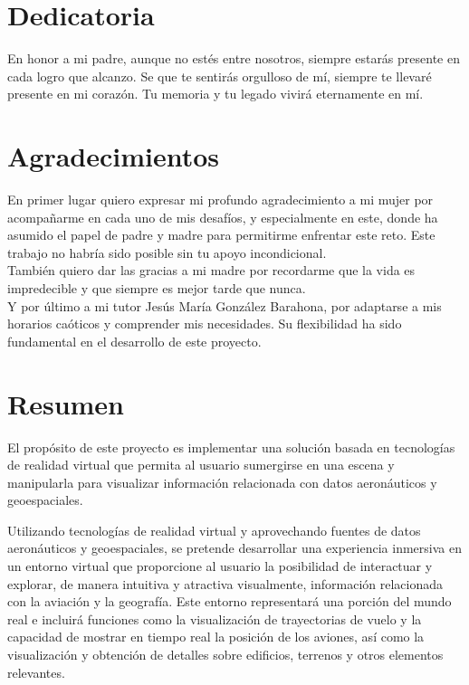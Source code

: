 \documentclass[a4paper, 11pt]{book}
\begin{document}

\chapter*{Dedicatoria}
En honor a mi padre, aunque no estés entre nosotros, siempre estarás presente en cada logro que alcanzo. Se que te sentirás orgulloso de mí, siempre te llevaré presente en mi corazón. Tu memoria y tu legado vivirá eternamente en mí.


\chapter*{Agradecimientos}

En primer lugar quiero expresar mi profundo agradecimiento a mi mujer por acompañarme en cada uno de mis desafíos, y especialmente en este, donde ha asumido el papel de padre y madre para permitirme enfrentar este reto. Este trabajo no habría sido posible sin tu apoyo incondicional.\\
También quiero dar las gracias a mi madre por recordarme que la vida es impredecible y que siempre es mejor tarde que nunca.\\
Y por último a mi tutor Jesús María González Barahona, por adaptarse a mis horarios caóticos y comprender mis necesidades. Su flexibilidad ha sido fundamental en el desarrollo de este proyecto.


\chapter*{Resumen}

El propósito de este proyecto es implementar una solución basada en tecnologías de realidad virtual que permita al usuario sumergirse en una escena y manipularla para visualizar información relacionada con datos aeronáuticos y geoespaciales.

Utilizando tecnologías de realidad virtual y aprovechando fuentes de datos aeronáuticos y geoespaciales, se pretende desarrollar una experiencia inmersiva en un entorno virtual que proporcione al usuario la posibilidad de interactuar y explorar, de manera intuitiva y atractiva visualmente, información relacionada con la aviación y la geografía. Este entorno representará una porción del mundo real e incluirá funciones como la visualización de trayectorias de vuelo y la capacidad de mostrar en tiempo real la posición de los aviones, así como la visualización y obtención de detalles sobre edificios, terrenos y otros elementos relevantes.
\end{document}
